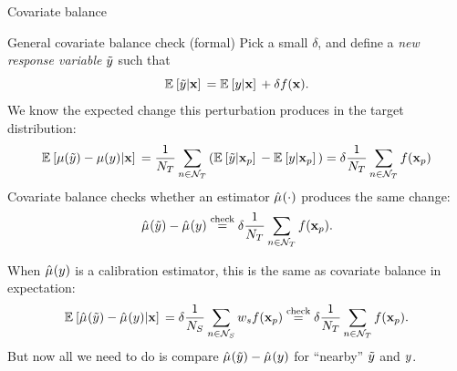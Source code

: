 \begin{frame}[t]{Covariate balance}


\begin{block}{General covariate balance check (formal)}
    Pick a small $\delta$, and define a \emph{new response variable} $\tilde{y}$ such that
    $$
    \mathbb{E}_{}\left[ \tilde{y} \vert \mathbf{x}\right]\, = \mathbb{E}_{}\left[ y \vert \mathbf{x}\right]\, + \delta f(\mathbf{x}).
    $$
    We know the expected change this perturbation produces in the target distribution:
    $$
    \begin{aligned}
            \mathbb{E}_{}\left[ \mu(\tilde{y}) - \mu(y) | \mathbf{x}\right]\, =
            \frac{1}{N_{T}} \sum_{n \in \mathcal{N}_{T}} \left(\mathbb{E}_{}\left[ \tilde{y} | \mathbf{x}_p\right]\, - \mathbb{E}_{}\left[ y | \mathbf{x}_p\right]\,\right) =
            \delta \frac{1}{N_{T}} \sum_{n \in \mathcal{N}_{T}} f(\mathbf{x}_p)
    \end{aligned}
    $$
    Covariate balance checks whether an estimator $\hat{\mu}^{}(\cdot)$ produces
    the same change:
    $$
    \begin{aligned}
    \hat{\mu}^{}(\tilde{y}) - \hat{\mu}^{}(y)
        \overset{\textrm{check}}{=}
        \delta \frac{1}{N_{T}} \sum_{n \in \mathcal{N}_{T}} f(\mathbf{x}_p).
    \end{aligned}
    $$
\end{block}

When $\hat{\mu}^{}(y)$ is a calibration estimator, this is the same as covariate balance
in expectation:
$$
\begin{aligned}
    \mathbb{E}_{}\left[ \hat{\mu}^{}(\tilde{y}) - \hat{\mu}^{}(y) | \mathbf{x}\right]\, =
    \delta \frac{1}{N_{S}} \sum_{n \in \mathcal{N}_{S}} w_s f(\mathbf{x}_p) \overset{\textrm{check}}{=}
        \delta \frac{1}{N_{T}} \sum_{n \in \mathcal{N}_{T}} f(\mathbf{x}_p).
\end{aligned}
$$
%
But now all we need to do is compare $\hat{\mu}^{}(\tilde{y}) - \hat{\mu}^{}(y)$ for
``nearby'' $\tilde{y}$ and $y$.



\end{frame}







